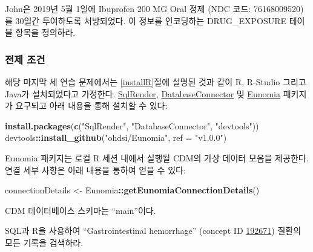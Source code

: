 \documentclass[10.5pt]{book}
\newenvironment{Shaded}{\begin{snugshade}}{\end{snugshade}}
\newcommand{\KeywordTok}[1]{\textcolor[rgb]{0.13,0.29,0.53}{\textbf{#1}}}
\newcommand{\DataTypeTok}[1]{\textcolor[rgb]{0.13,0.29,0.53}{#1}}
\newcommand{\StringTok}[1]{\textcolor[rgb]{0.31,0.60,0.02}{#1}}
\newcommand{\OperatorTok}[1]{\textcolor[rgb]{0.81,0.36,0.00}{\textbf{#1}}}
\newcommand{\NormalTok}[1]{#1}
\theoremstyle{definition}
\theoremstyle{definition}
\theoremstyle{definition}
\theoremstyle{remark}
\let\BeginKnitrBlock\begin \let\EndKnitrBlock\end
\begin{document}
\BeginKnitrBlock{exercise}
\protect\hypertarget{exr:exerciseJohnDrug}{}{\label{exr:exerciseJohnDrug}
}John은 2019년 5월 1일에 Ibuprofen 200 MG Oral 정제 (NDC 코드:
76168009520)를 30일간 투여하도록 처방되었다. 이 정보를 인코딩하는
DRUG\_EXPOSURE 테이블 항목을 정의하라.
\EndKnitrBlock{exercise}

\subsubsection*{전제 조건}\label{--1}

해당 마지막 세 연습 문제에서는 \ref{installR}절에 설명된 것과 같이 R,
R-Studio 그리고 Java가 설치되었다고 가정한다.
\href{https://ohdsi.github.io/SqlRender/}{SqlRender},
\href{https://ohdsi.github.io/DatabaseConnector/}{DatabaseConnector} 및
\href{https://ohdsi.github.io/Eunomia/}{Eunomia} 패키지가 요구되고 아래
내용을 통해 설치할 수 있다:

\begin{Shaded}
\begin{Highlighting}[]
\KeywordTok{install.packages}\NormalTok{(}\KeywordTok{c}\NormalTok{(}\StringTok{"SqlRender"}\NormalTok{, }\StringTok{"DatabaseConnector"}\NormalTok{, }\StringTok{"devtools"}\NormalTok{))}
\NormalTok{devtools}\OperatorTok{::}\KeywordTok{install_github}\NormalTok{(}\StringTok{"ohdsi/Eunomia"}\NormalTok{, }\DataTypeTok{ref =} \StringTok{"v1.0.0"}\NormalTok{)}
\end{Highlighting}
\end{Shaded}

Eunomia 패키지는 로컬 R 세션 내에서 실행될 CDM의 가상 데이터 모음을
제공한다. 연결 세부 사항은 아래 내용을 통하여 얻을 수 있다:

\begin{Shaded}
\begin{Highlighting}[]
\NormalTok{connectionDetails <-}\StringTok{ }\NormalTok{Eunomia}\OperatorTok{::}\KeywordTok{getEunomiaConnectionDetails}\NormalTok{()}
\end{Highlighting}
\end{Shaded}

CDM 데이터베이스 스키마는 ``main''이다.

\BeginKnitrBlock{exercise}
\protect\hypertarget{exr:exerciseGiBleedRecords}{}{\label{exr:exerciseGiBleedRecords}
}SQL과 R을 사용하여 ``Gastrointestinal hemorrhage'' (concept ID
\href{http://athena.ohdsi.org/search-terms/terms/192671}{192671}) 질환의
모든 기록을 검색하라.
\EndKnitrBlock{exercise}
\end{document}
